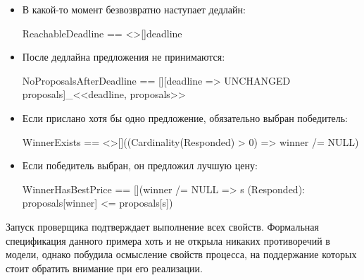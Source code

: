 \documentclass[14pt, openany]{report}
\begin{document}
\begin{itemize}
  \item В какой-то момент безвозвратно наступает дедлайн:
  \begin{tla}
    ReachableDeadline == <>[]deadline
  \end{tla}
\begin{tlatex}
%
\end{tlatex}
  \item После дедлайна предложения не принимаются:
  \begin{tla}
    NoProposalsAfterDeadline == 
        [][deadline => UNCHANGED proposals]_<<deadline, proposals>>
  \end{tla}
\begin{tlatex}
%
\end{tlatex}
\item Если прислано хотя бы одно предложение, обязательно выбран победитель:
  \begin{tla}
    WinnerExists == <>[]((Cardinality(Responded) > 0) => winner /= NULL)
  \end{tla}
\begin{tlatex}
\end{tlatex}
  \item Если победитель выбран, он предложил лучшую цену:
  \begin{tla}
    WinnerHasBestPrice == 
        [](winner /= NULL => \A s \in (Responded):
        proposals[winner] <= proposals[s])
  \end{tla}
\begin{tlatex}
%
%
\end{tlatex}
\end{itemize}

Запуск проверщика подтверждает выполнение всех свойств. Формальная спецификация данного примера хоть и не открыла никаких противоречий в модели, однако побудила осмысление свойств процесса, на поддержание которых стоит обратить внимание при его реализации.
\end{document}
